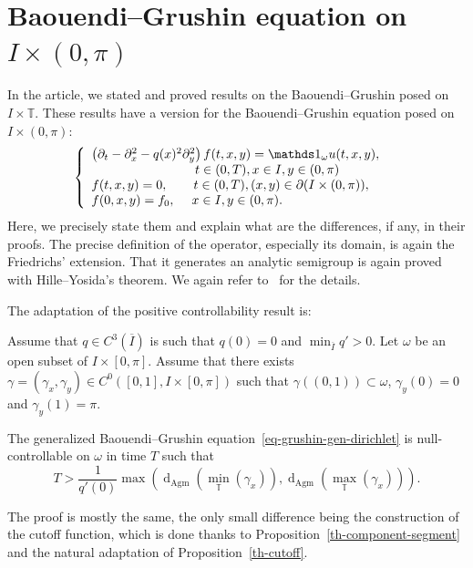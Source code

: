 \documentclass[AHL,Unicode,longabstracts,published]{cedram}
\newcommand{\1}{\mathds 1}
\newcommand{\dagmon}{\mathop{\mathrm{d}}\nolimits_{\mathrm{Agm}}}
\newcommand{\T}{\mathbb{T}}
\newcommand{\g}{\gamma}
\renewcommand{\o}{\omega}
\renewcommand{\o}{\omega}
\begin{document}
\appendix

\section{Baouendi--Grushin equation on $I\times(0,\pi)$}\label{app-dirichlet}
In the article, we stated and proved results on the Baouendi--Grushin posed on $I\times \T$. These results have a version for the Baouendi--Grushin equation posed on $I\times (0,\pi)$:
\begin{equation}\label{eq-grushin-gen-dirichlet}
\left\{
\begin{array}{ll}
\left(\partial_t-\partial_x^2 - q(x)^2 \partial_y^2\right)f(t,x,y) = \1_\o u(t,x,y),&\\
\mkern146mu t\in (0,T), x\in I, y\in (0,\pi)\\
f(t,x,y) = 0,\qquad t\in (0,T), (x,y) \in \partial (I\times (0,\pi)), \\
f(0,x,y) = f_0, \quad \; x\in I, y\in (0,\pi).
\end{array}\right.
\end{equation}
Here, we precisely state them and explain what are the differences, if any, in their proofs. The precise definition of the operator, especially its domain, is again the Friedrichs' extension. That it generates an analytic semigroup is again proved with Hille--Yosida's theorem. We again refer to~\cite{BCG14,Brezis11,Helffer13} for the details.

The adaptation of the positive controllability result is:

\begin{theo}\label{th-main-pos-dirichlet}
Assume that $q\in C^3(\overline I)$ is such that $q(0) = 0$ and $\min_{\overline I} q' >0$. Let $\o$ be an open subset of $I\times [0,\pi]$. Assume that there exists $\gamma = (\g_x, \g_y) \in C^0([0,1], I\times [0,\pi])$ such that $\g((0,1)) \subset \o$, $\g_y(0) = 0$ and $\g_y(1) = \pi$.

The generalized Baouendi--Grushin equation~\eqref{eq-grushin-gen-dirichlet} is null-controllable on $\o$ in time $T$ such that
\[
T> \frac{1}{q'(0)}\max\left(\dagmon\left(\min_\T(\g_x)\right), \dagmon\left(\max_\T (\g_x)\right)\right).
\]
\end{theo}

The proof is mostly the same, the only small difference being the construction of the cutoff function, which is done thanks to Proposition~\ref{th-component-segment} and the natural adaptation of Proposition~\ref{th-cutoff}.
\end{document}
